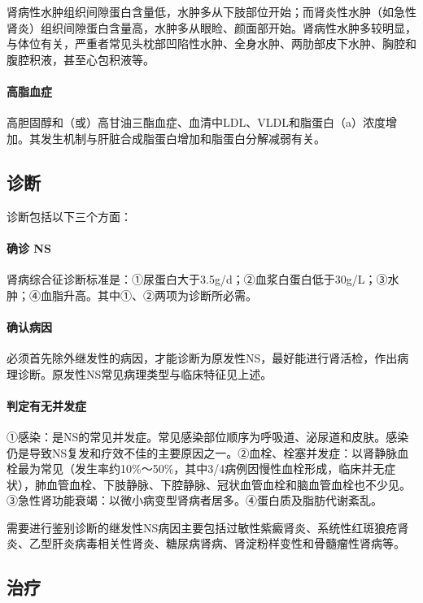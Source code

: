 肾病性水肿组织间隙蛋白含量低，水肿多从下肢部位开始；而肾炎性水肿（如急性肾炎）组织间隙蛋白含量高，水肿多从眼睑、颜面部开始。肾病性水肿多较明显，与体位有关，严重者常见头枕部凹陷性水肿、全身水肿、两肋部皮下水肿、胸腔和腹腔积液，甚至心包积液等。

\paragraph{高脂血症}

高胆固醇和（或）高甘油三酯血症、血清中LDL、VLDL和脂蛋白（a）浓度增加。其发生机制与肝脏合成脂蛋白增加和脂蛋白分解减弱有关。

\subsection{诊断}

诊断包括以下三个方面：

\paragraph{确诊 NS}

肾病综合征诊断标准是：①尿蛋白大于3.5g/d；②血浆白蛋白低于30g/L；③水肿；④血脂升高。其中①、②两项为诊断所必需。

\paragraph{确认病因}

必须首先除外继发性的病因，才能诊断为原发性NS，最好能进行肾活检，作出病理诊断。原发性NS常见病理类型与临床特征见上述。

\paragraph{判定有无并发症}

①感染：是NS的常见并发症。常见感染部位顺序为呼吸道、泌尿道和皮肤。感染仍是导致NS复发和疗效不佳的主要原因之一。②血栓、栓塞并发症：以肾静脉血栓最为常见（发生率约10\%～50\%，其中3/4病例因慢性血栓形成，临床并无症状），肺血管血栓、下肢静脉、下腔静脉、冠状血管血栓和脑血管血栓也不少见。③急性肾功能衰竭：以微小病变型肾病者居多。④蛋白质及脂肪代谢紊乱。

需要进行鉴别诊断的继发性NS病因主要包括过敏性紫癜肾炎、系统性红斑狼疮肾炎、乙型肝炎病毒相关性肾炎、糖尿病肾病、肾淀粉样变性和骨髓瘤性肾病等。

\subsection{治疗}

